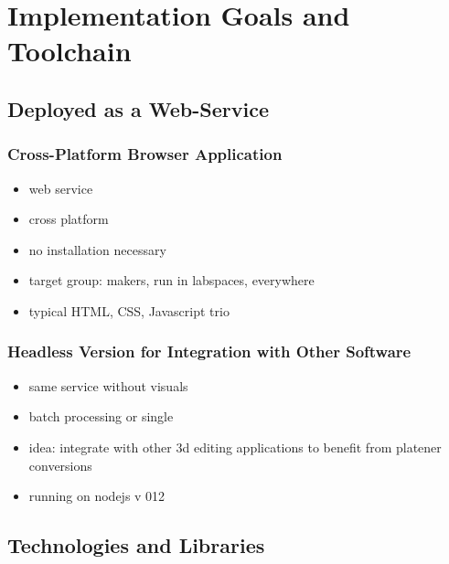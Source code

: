 \documentclass[../ClassicThesis.tex]{subfiles}
\begin{document}
\chapter{Implementation Goals and Toolchain}\label{ch:toolchain}

\newcommand\myNotes[1]{\textcolor{red}{#1}}

\section{Deployed as a Web-Service}

\subsection{Cross-Platform Browser Application}

\begin{itemize}
\item web service
\item cross platform
\item no installation necessary
\item target group: makers, run in labspaces, everywhere
\item typical HTML, CSS, Javascript trio
\end{itemize}

\subsection{Headless Version for Integration with Other Software}

\begin{itemize}
\item same service without visuals
\item batch processing or single
\item idea: integrate with other 3d editing applications to benefit
  from platener conversions
\item running on nodejs v 012
\end{itemize}

\section{Technologies and Libraries}
\end{document}
